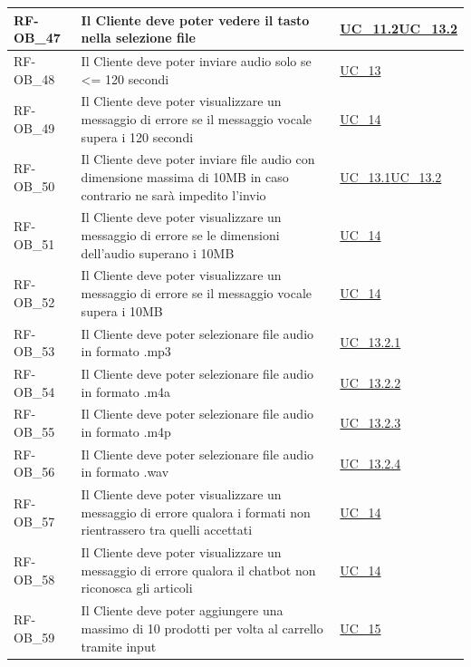 \begin{longtable}{|>{\raggedright}p{}|>{\raggedright\arraybackslash}p{}|>{\raggedright\arraybackslash}p{}|}
	\hline
	RF-OB\_47 \hypertarget{rf-ob_47} & Il Cliente deve poter vedere il tasto \vr{Seleziona} nella selezione file & \hyperref[uc_11.2]{UC\_11.2}\newline \hyperref[uc_13.2]{UC\_13.2} \\
	\hline
	RF-OB\_48 \hypertarget{rf-ob_48} & Il Cliente deve poter inviare audio solo se <= 120 secondi & \hyperref[uc_13]{UC\_13} \\
	\hline
	RF-OB\_49 \hypertarget{rf-ob_49} & Il Cliente deve poter visualizzare un messaggio di errore se il messaggio vocale supera i 120 secondi & \hyperref[uc_14]{UC\_14} \\
	\hline
	RF-OB\_50 \hypertarget{rf-ob_50} & Il Cliente deve poter inviare file audio con dimensione massima di 10MB in caso contrario ne sarà impedito l'invio & \hyperref[uc_13.1]{UC\_13.1}\newline \hyperref[uc_13.2]{UC\_13.2} \\
	\hline
	RF-OB\_51 \hypertarget{rf-ob_51} & Il Cliente deve poter visualizzare un messaggio di errore se le dimensioni dell'audio superano i 10MB & \hyperref[uc_14]{UC\_14} \\
	\hline
	RF-OB\_52 \hypertarget{rf-ob_52} & Il Cliente deve poter visualizzare un messaggio di errore se il messaggio vocale supera i 10MB & \hyperref[uc_14]{UC\_14} \\
	\hline
	RF-OB\_53 \hypertarget{rf-ob_53} & Il Cliente deve poter selezionare file audio in formato .mp3 & \hyperref[uc_13.2.1]{UC\_13.2.1}\\
	\hline
	RF-OB\_54 \hypertarget{rf-ob_54} & Il Cliente deve poter selezionare file audio in formato .m4a & \hyperref[uc_13.2.2]{UC\_13.2.2} \\
	\hline
	RF-OB\_55 \hypertarget{rf-ob_55} & Il Cliente deve poter selezionare file audio in formato .m4p & \hyperref[uc_13.2.3]{UC\_13.2.3} \\
	\hline
	RF-OB\_56 \hypertarget{rf-ob_56} & Il Cliente deve poter selezionare file audio in formato .wav & \hyperref[uc_13.2.4]{UC\_13.2.4} \\
	\hline
	RF-OB\_57 \hypertarget{rf-ob_57} & Il Cliente deve poter visualizzare un messaggio di errore qualora i formati non rientrassero tra quelli accettati & \hyperref[uc_14]{UC\_14} \\
	\hline
	RF-OB\_58 \hypertarget{rf-ob_58} & Il Cliente deve poter visualizzare un messaggio di errore qualora il chatbot non riconosca gli articoli & \hyperref[uc_14]{UC\_14} \\
	\hline
	RF-OB\_59 \hypertarget{rf-ob_59} & Il Cliente deve poter aggiungere una massimo di 10 prodotti per volta al carrello tramite input & \hyperref[uc_15]{UC\_15} \\

\end{longtable}
